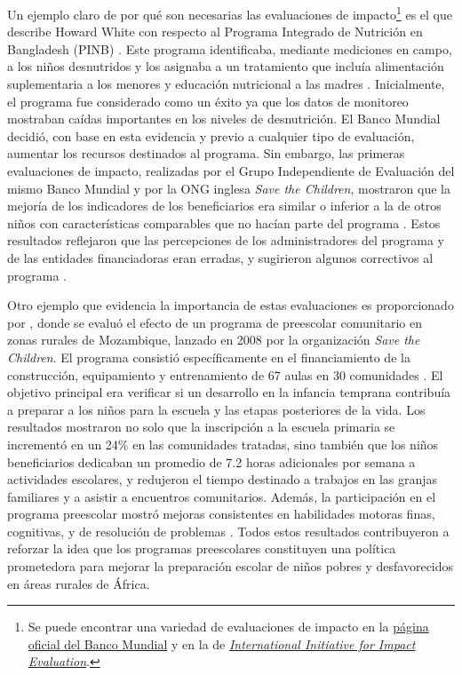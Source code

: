 \documentclass[../../main.tex]{subfiles}
\begin{document}
Un ejemplo claro de por qué son necesarias las evaluaciones de impacto\footnote{Se puede
encontrar una variedad de evaluaciones de impacto en la
\href{https://www.worldbank.org/en/about/unit/unit-dec/impactevaluation/programs}{página
oficial del Banco Mundial} y en la de
\href{https://developmentevidence.3ieimpact.org/search-results?search_text=aW1wYWN0IGV2YWx1YXRpb24=&page=1&per_page=50&sort_by=relevance&filters=}{\textit{International
Initiative for Impact Evaluation}}.} es el que describe Howard White con respecto al
Programa Integrado de Nutrición en Bangladesh (PINB) \cite{white2009theory}. Este programa
identificaba, mediante mediciones en campo, a los niños desnutridos y los asignaba a un
tratamiento que incluía alimentación suplementaria a los menores y educación nutricional a
las madres \cite{bernal}. Inicialmente, el programa fue considerado como un éxito ya que
los datos de monitoreo mostraban caídas importantes en los niveles de desnutrición. El
Banco Mundial decidió, con base en esta evidencia y previo a cualquier tipo de evaluación,
aumentar los recursos destinados al programa. Sin embargo, las primeras evaluaciones de
impacto, realizadas por el Grupo Independiente de Evaluación del mismo Banco Mundial y por
la ONG inglesa \textit{Save the Children}, mostraron que la mejoría de los indicadores de
los beneficiarios era similar o inferior a la de otros niños con características
comparables que no hacían parte del programa \cite{bernal}. Estos resultados reflejaron
que las percepciones de los administradores del programa y de las entidades financiadoras
eran erradas, y sugirieron algunos correctivos al programa \cite{bernal}.

Otro ejemplo que evidencia la importancia de estas evaluaciones es proporcionado por
\cite{preschool-africa-2012}, donde se evaluó el efecto de un programa de preescolar
comunitario en zonas rurales de Mozambique, lanzado en 2008 por la organización \textit{Save the
Children}. El programa consistió específicamente en el financiamiento de la construcción,
equipamiento y entrenamiento de 67 aulas en 30 comunidades \cite{preschool-africa-2012}. El
objetivo principal era verificar si un desarrollo en la infancia temprana contribuía a
preparar a los niños para la escuela y las etapas posteriores de la vida. Los resultados
mostraron no solo que la inscripción a la escuela primaria se incrementó en un 24\% en las
comunidades tratadas, sino también que los niños beneficiarios dedicaban un promedio de
7.2 horas adicionales por semana a actividades escolares, y redujeron el tiempo destinado a
trabajos en las granjas familiares y a asistir a encuentros comunitarios. Además, la
participación en el programa preescolar mostró mejoras consistentes en habilidades motoras
finas, cognitivas, y de resolución de problemas \cite{preschool-africa-2012}. Todos estos
resultados contribuyeron a reforzar la idea que los programas preescolares constituyen
una política prometedora para mejorar la preparación escolar de niños pobres y
desfavorecidos en áreas rurales de África.
\end{document}
